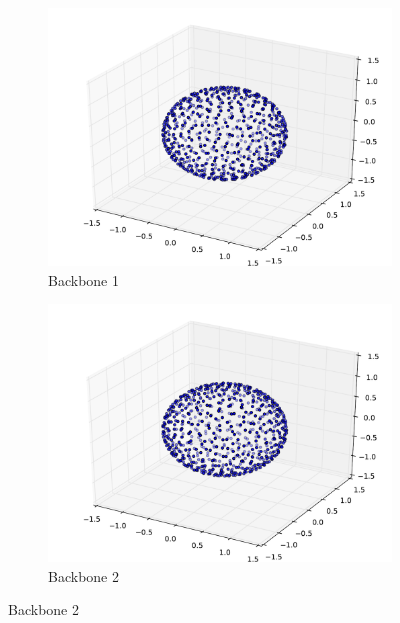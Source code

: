 \documentclass[oneside, titlepage]{scrartcl}
\begin{document}
\begin{figure}[!h]
\begin{subfigure}{0.5\textwidth}
	\centering
	\includegraphics[width=0.9\linewidth]{figures/simplegraph9.pdf}
	\caption{Backbone 1}
\end{subfigure}%
\begin{subfigure}{0.5\textwidth}
	\centering
	\includegraphics[width=0.9\linewidth]{figures/simplegraph91.pdf}
	\caption{Backbone 2}
\end{subfigure}
\end{figure}
\end{document}
